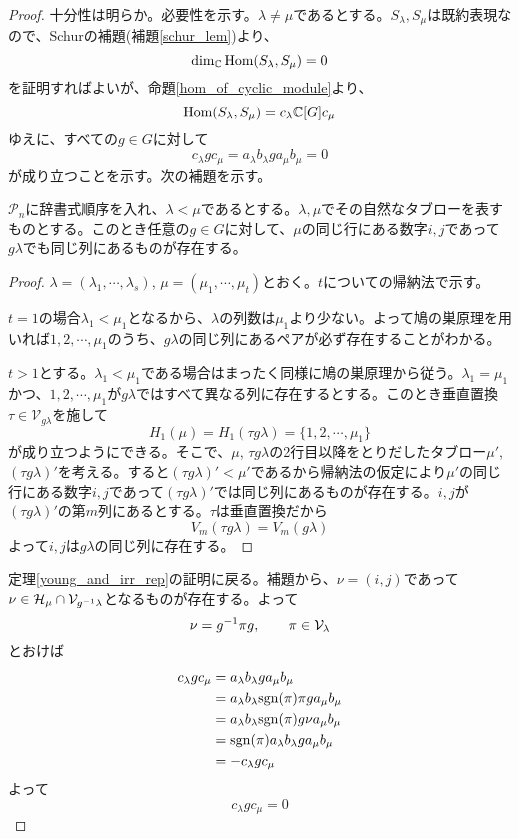 \documentclass{ltjsreport}
\begin{document}
\begin{proof}
  十分性は明らか。必要性を示す。$\lambda\neq\mu$であるとする。$S_\lambda, S_\mu$は既約表現なので、Schurの補題(補題\ref{schur_lem})より、
  \[
  \dim_{\mathbb{C}}\text{Hom}(S_\lambda,S_\mu)=0  
  \]
  を証明すればよいが、命題\ref{hom_of_cyclic_module}より、
  \[
  \text{Hom}(S_\lambda,S_\mu)=c_\lambda\mathbb{C}[G]c_\mu
  \]
  ゆえに、すべての$g\in G$に対して
  \[
  c_\lambda gc_\mu  =a_\lambda b_\lambda g a_\mu b_\mu = 0
  \]
  が成り立つことを示す。次の補題を示す。
  \begin{lemm}\label{lexicographical}
    $\mathcal{P}_n$に辞書式順序を入れ、$\lambda < \mu$であるとする。$\lambda, \mu$でその自然なタブローを表すものとする。このとき任意の$g\in G$に対して、$\mu$の同じ行にある数字$i,j$であって$g\lambda$でも同じ列にあるものが存在する。
  \end{lemm}

  \begin{proof}
    $\lambda=(\lambda_1,\cdots,\lambda_s)$, $\mu=(\mu_1,\cdots,\mu_t)$とおく。$t$についての帰納法で示す。

    $t=1$の場合$\lambda_1<\mu_1$となるから、$\lambda$の列数は$\mu_1$より少ない。よって鳩の巣原理を用いれば$1,2,\cdots,\mu_1$のうち、$g\lambda$の同じ列にあるペアが必ず存在することがわかる。

    $t>1$とする。$\lambda_1<\mu_1$である場合はまったく同様に鳩の巣原理から従う。$\lambda_1=\mu_1$かつ、$1,2,\cdots,\mu_1$が$g\lambda$ではすべて異なる列に存在するとする。このとき垂直置換$\tau\in\mathcal{V}_{g\lambda}$を施して
    \[
    H_1(\mu)=H_1(\tau g\lambda)=\{1,2,\cdots,\mu_1\}  
    \]
    が成り立つようにできる。そこで、$\mu$, $\tau g\lambda$の2行目以降をとりだしたタブロー$\mu'$, $(\tau g\lambda)'$を考える。すると$(\tau g\lambda)'<\mu'$であるから帰納法の仮定により$\mu'$の同じ行にある数字$i,j$であって$(\tau g\lambda)'$では同じ列にあるものが存在する。$i,j$が$(\tau g\lambda)'$の第$m$列にあるとする。$\tau$は垂直置換だから
    \[
    V_m(\tau g\lambda)=V_m(g\lambda)
    \]
    よって$i,j$は$g\lambda$の同じ列に存在する。
  \end{proof}

  定理\ref{young_and_irr_rep}の証明に戻る。補題から、$\nu=(i,j)$であって$\nu\in \mathcal{H}_\mu\cap\mathcal{V}_{g^{-1}\lambda}$となるものが存在する。よって
  \[
  \nu=g^{-1}\pi g,\qquad \pi\in \mathcal{V}_{\lambda}
  \]
  とおけば
  \begin{align*}
    c_\lambda g c_\mu
    &=a_\lambda b_\lambda g a_\mu b_\mu\\
    &=a_\lambda b_\lambda \mathrm{sgn}(\pi)\pi g a_\mu b_\mu\\
    &=a_\lambda b_\lambda \mathrm{sgn}(\pi)g\nu a_\mu b_\mu\\
    &=\mathrm{sgn}(\pi)a_\lambda b_\lambda g a_\mu b_\mu\\
    &=-c_\lambda g c_\mu
  \end{align*}
  よって
  \[
    c_\lambda g c_\mu=0
  \]
\end{proof}
\end{document}
